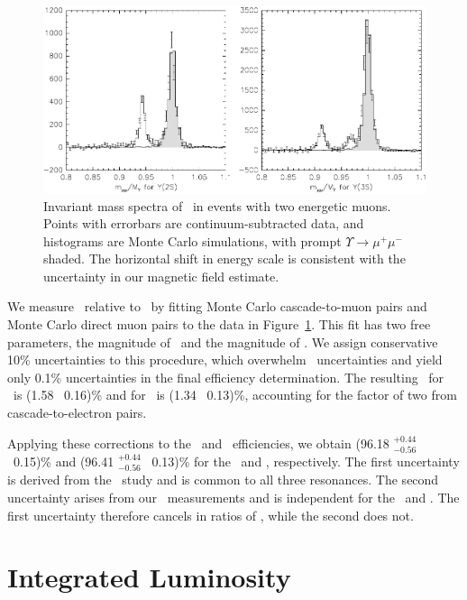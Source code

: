 \documentclass{cornell}
\begin{document}
\begin{figure}[p]
  \begin{center}
    \includegraphics[width=\linewidth]{plots/invariantmumass}
  \end{center}
  \caption{\label{invariantmumass} Invariant mass spectra of \mumu\ in
  events with two energetic muons.  Points with errorbars are
  continuum-subtracted data, and histograms are Monte Carlo
  simulations, with prompt $\Upsilon \to \mu^+\mu^-$ shaded.  The
  horizontal shift in energy scale is consistent with the uncertainty
  in our magnetic field estimate.}
\end{figure}

We measure \bcas\ relative to \bmm\ by fitting Monte Carlo
cascade-to-muon pairs and Monte Carlo direct muon pairs to the data in
Figure~\ref{invariantmumass}.  This fit has two free parameters, the
magnitude of \bcas\ and the magnitude of \bmm.  We assign conservative
10\% uncertainties to this procedure, which overwhelm \bmm\
uncertainties and yield only 0.1\% uncertainties in the final
efficiency determination.  The resulting \bcas\ for \uss\ is (1.58
\PM\ 0.16)\% and for \usss\ is (1.34 \PM\ 0.13)\%, accounting for the
factor of two from cascade-to-electron pairs.

Applying these corrections to the \uss\ and \usss\ efficiencies, we
obtain (96.18 $^{+0.44}_{-0.56}$ \PM\ 0.15)\% and (96.41
$^{+0.44}_{-0.56}$ \PM\ 0.13)\% for the \uss\ and \usss, respectively.
The first uncertainty is derived from the \twotoone\ study and is
common to all three resonances.  The second uncertainty arises from
our \bcas\ measurements and is independent for the \uss\ and \usss.
The first uncertainty therefore cancels in ratios of \gee, while the
second does not.

\chapter{Integrated Luminosity}
\label{chp:luminosity}
\end{document}
